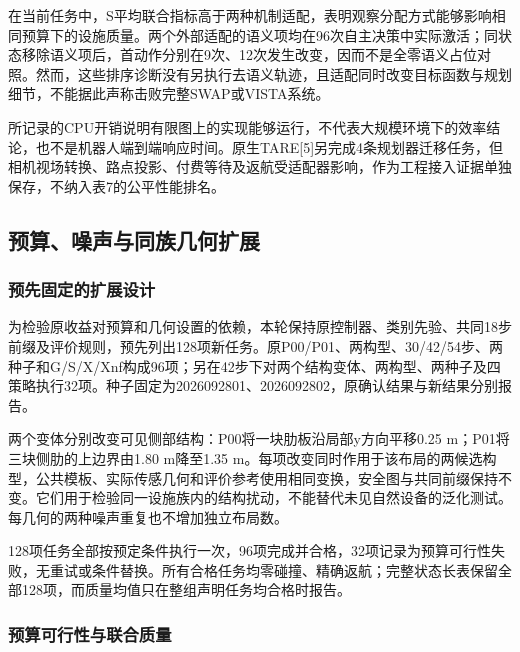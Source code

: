 \documentclass[11pt,a4paper]{article}
\begin{document}
在当前任务中，S平均联合指标高于两种机制适配，表明观察分配方式能够影响相同预算下的设施质量。两个外部适配的语义项均在96次自主决策中实际激活；同状态移除语义项后，首动作分别在9次、12次发生改变，因而不是全零语义占位对照。然而，这些排序诊断没有另执行去语义轨迹，且适配同时改变目标函数与规划细节，不能据此声称击败完整SWAP或VISTA系统。

所记录的CPU开销说明有限图上的实现能够运行，不代表大规模环境下的效率结论，也不是机器人端到端响应时间。原生TARE{[}5{]}另完成4条规划器迁移任务，但相机视场转换、路点投影、付费等待及返航受适配器影响，作为工程接入证据单独保存，不纳入表7的公平性能排名。

\hypertarget{ux9884ux7b97ux566aux58f0ux4e0eux540cux65cfux51e0ux4f55ux6269ux5c55}{%
\subsection{预算、噪声与同族几何扩展}\label{ux9884ux7b97ux566aux58f0ux4e0eux540cux65cfux51e0ux4f55ux6269ux5c55}}

\hypertarget{ux9884ux5148ux56faux5b9aux7684ux6269ux5c55ux8bbeux8ba1}{%
\subsubsection{预先固定的扩展设计}\label{ux9884ux5148ux56faux5b9aux7684ux6269ux5c55ux8bbeux8ba1}}

为检验原收益对预算和几何设置的依赖，本轮保持原控制器、类别先验、共同18步前缀及评价规则，预先列出128项新任务。原P00/P01、两构型、30/42/54步、两种子和G/S/X/Xnf构成96项；另在42步下对两个结构变体、两构型、两种子及四策略执行32项。种子固定为2026092801、2026092802，原确认结果与新结果分别报告。

两个变体分别改变可见侧部结构：P00将一块肋板沿局部y方向平移0.25 m；P01将三块侧肋的上边界由1.80 m降至1.35 m。每项改变同时作用于该布局的两候选构型，公共模板、实际传感几何和评价参考使用相同变换，安全图与共同前缀保持不变。它们用于检验同一设施族内的结构扰动，不能替代未见自然设备的泛化测试。每几何的两种噪声重复也不增加独立布局数。

128项任务全部按预定条件执行一次，96项完成并合格，32项记录为预算可行性失败，无重试或条件替换。所有合格任务均零碰撞、精确返航；完整状态长表保留全部128项，而质量均值只在整组声明任务均合格时报告。

\hypertarget{ux9884ux7b97ux53efux884cux6027ux4e0eux8054ux5408ux8d28ux91cf}{%
\subsubsection{预算可行性与联合质量}\label{ux9884ux7b97ux53efux884cux6027ux4e0eux8054ux5408ux8d28ux91cf}}
\end{document}
